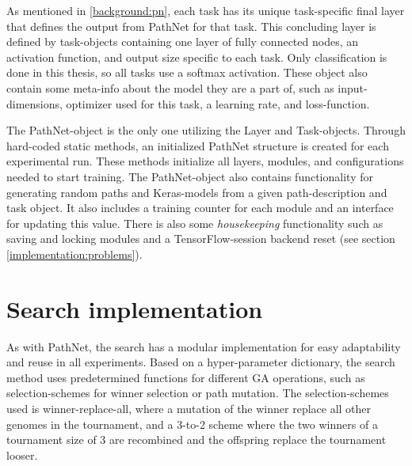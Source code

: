 As mentioned in \ref{background:pn}, each task has its unique task-specific final layer that defines the output from PathNet for that task. This concluding layer is defined by task-objects containing one layer of fully connected nodes, an activation function, and output size specific to each task. Only classification is done in this thesis, so all tasks use a softmax activation. These object also contain some meta-info about the model they are a part of, such as input-dimensions, optimizer used for this task, a learning rate, and loss-function. 

The PathNet-object is the only one utilizing the Layer and Task-objects. Through hard-coded static methods, an initialized PathNet structure is created for each experimental run. These methods initialize all layers, modules, and configurations needed to start training. The PathNet-object also contains functionality for generating random paths and Keras-models from a given path-description and task object. It also includes a training counter for each module and an interface for updating this value. There is also some \textit{housekeeping} functionality such as saving and locking modules and a TensorFlow-session backend reset (see section \ref{implementation:problems}).

\section{Search implementation}
\label{implementation.search}
As with PathNet, the search has a modular implementation for easy adaptability and reuse in all experiments. Based on a hyper-parameter dictionary, the search method uses predetermined functions for different GA operations, such as selection-schemes for winner selection or path mutation. The selection-schemes used is winner-replace-all, where a mutation of the winner replace all other genomes in the tournament, and a 3-to-2 scheme where the two winners of a tournament size of 3 are recombined and the offspring replace the tournament looser.


